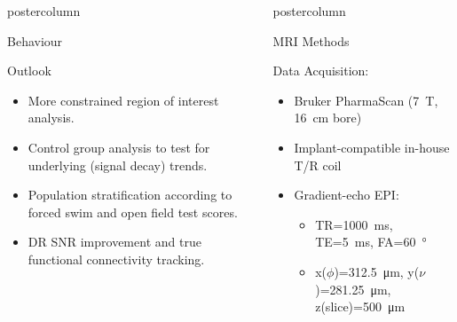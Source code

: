 \documentclass{beamer}
\newlength{\columnheight}
\begin{document}
\begin{frame}
\begin{columns}
\begin{column}{.43\textwidth}
\begin{beamercolorbox}[center]{postercolumn}
\begin{minipage}{.98\textwidth}
{\begin{myblock}{Behaviour}
						\vspace{0.6em}
						\vspace{-1em}
					\end{myblock}\vfill
					\vspace{-0.3em}
					\begin{myblock}{Outlook}
						\begin{itemize}
							\item More constrained region of interest analysis.
							\item Control group analysis to test for underlying (signal decay) trends.
							\item Population stratification according to forced swim and open field test scores.
							\item DR SNR improvement and true functional connectivity tracking.
						\end{itemize}
					\end{myblock}\vfill
		}\end{minipage}\end{beamercolorbox}
	\end{column}
	\begin{column}{.57\textwidth}
		\begin{beamercolorbox}[center]{postercolumn}
			\begin{minipage}{.98\textwidth} %
				\parbox[t][\columnheight]{\textwidth}{ %
					\begin{myblock}{MRI Methods}
						\vspace{0.5em}
						\begin{center}
							\begin{minipage}{.37\textwidth}
							Data Acquisition:
								\begin{itemize}
									\item Bruker PharmaScan (\SI{7}{\tesla}, \SI{16}{\centi\metre} bore)
									\item Implant-compatible in-house T/R coil
									\item Gradient-echo EPI:
										\begin{itemize}
											\item TR=\SI{1000}{\ms}, TE=\SI{5}{\ms}, FA=\SI{60}{\degree}
											\item x($\phi$)=\SI{312.5}{\um}, y($\nu$)=\SI{281.25}{\um}, z(slice)=\SI{500}{\um}

\end{itemize}
\end{itemize}
\end{minipage}
\end{center}
\end{myblock}}
\end{minipage}
\end{beamercolorbox}
\end{column}
\end{columns}
\end{frame}
\end{document}
